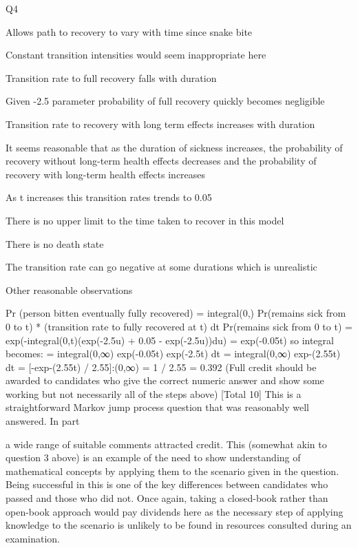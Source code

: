 Q4 \item  
Allows path to recovery to vary with time since snake bite \item 
Constant transition intensities would seem inappropriate here \item 
\item   Transition rate to full recovery falls with duration \item 
Given -2.5 parameter probability of full recovery quickly becomes negligible \item 
Transition rate to recovery with long term effects increases with duration \item 
It seems reasonable that as the duration of sickness increases, the probability of
recovery without long-term health effects decreases and the probability of recovery
with long-term health effects increases \item 
As t increases this transition rates trends to 0.05 \item 
There is no upper limit to the time taken to recover in this model \item 
There is no death state \item 
The transition rate can go negative at some durations which is unrealistic \item 
Other reasonable observations \item 
[Marks available 5½, maximum 3]
\item  Pr (person bitten eventually fully recovered)
= integral(0,) Pr(remains sick from 0 to t)
* (transition rate to fully recovered at t) dt 
Pr(remains sick from 0 to t) = exp(-integral(0,t)(exp(-2.5u) + 0.05 - exp(-2.5u))du) = exp(-0.05t) 
so integral becomes:
= integral(0,∞) exp(-0.05t) exp(-2.5t) dt = integral(0,∞) exp-(2.55t) dt 
= [-exp-(2.55t) / 2.55]:(0,∞) 
= 1 / 2.55 = 0.392 
\medskip 
(Full credit should be awarded to candidates who give the correct numeric answer and show some working but not necessarily all of the steps above)
[Total 10]
This is a straightforward Markov jump process question that was reasonably well answered.
In part \item   a wide range of suitable comments attracted credit. This (somewhat akin to question 3 above) is an example of the need to show understanding of mathematical concepts by applying them to the scenario given in the question. Being successful in this is one of the key differences between candidates who passed and those who did not. Once again, taking a closed-book rather than open-book approach would pay dividends here as the necessary step of applying knowledge to the scenario is unlikely to be found in resources consulted during an examination.

